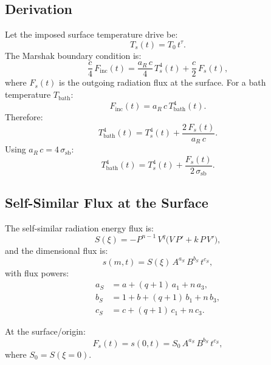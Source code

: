 \documentclass[11pt]{article}
\begin{document}
\subsection{Derivation}

Let the imposed surface temperature drive be:
\begin{equation}
  T_s(t) = T_0\,t^{\tau}.
\end{equation}
The Marshak boundary condition is:
\begin{equation}
  \frac{c}{4}\,F_{\mathrm{inc}}(t) = \frac{a_R\,c}{4}\,T_s^4(t)
  + \frac{c}{2}\,F_s(t),
\end{equation}
where $F_s(t)$ is the outgoing radiation flux at the surface. For a bath temperature $T_{\mathrm{bath}}$:
\begin{equation}
  F_{\mathrm{inc}}(t) = a_R\,c\,T_{\mathrm{bath}}^4(t).
\end{equation}
Therefore:
\begin{equation}
  T_{\mathrm{bath}}^4(t) = T_s^4(t) + \frac{2\,F_s(t)}{a_R\,c}.
\end{equation}
Using $a_R\,c = 4\,\sigma_{\mathrm{sb}}$:
\begin{equation}
  T_{\mathrm{bath}}^4(t) = T_s^4(t) + \frac{F_s(t)}{2\,\sigma_{\mathrm{sb}}}.
  \label{eq:Tbath4}
\end{equation}

\subsection{Self-Similar Flux at the Surface}

The self-similar radiation energy flux is:
\begin{equation}
  S(\xi) = -P^{n-1}\,V^{q}\bigl(V\,P' + k\,P\,V'\bigr),
  \label{eq:S_def}
\end{equation}
and the dimensional flux is:
\begin{equation}
  s(m,t) = S(\xi)\,A^{a_S}\,B^{b_S}\,t^{c_S},
\end{equation}
with flux powers:
\begin{align}
  a_S &= a + (q+1)\,a_1 + n\,a_3, \\
  b_S &= 1 + b + (q+1)\,b_1 + n\,b_3, \\
  c_S &= c + (q+1)\,c_1 + n\,c_3.
\end{align}

At the surface/origin:
\begin{equation}
  F_s(t) = s(0,t) = S_0\,A^{a_S}\,B^{b_S}\,t^{c_S},
\end{equation}
where $S_0 = S(\xi{=}0)$.
\end{document}
